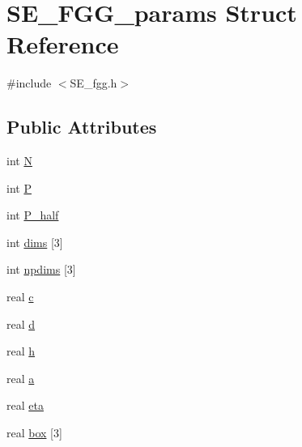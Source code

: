 \hypertarget{structSE__FGG__params}{\section{\-S\-E\-\_\-\-F\-G\-G\-\_\-params \-Struct \-Reference}
\label{structSE__FGG__params}
}


{\ttfamily \#include $<$\-S\-E\-\_\-fgg.\-h$>$}

\subsection*{\-Public \-Attributes}
\begin{DoxyCompactItemize}
\item 
int \hyperlink{structSE__FGG__params_a6fa81b6004b3f45199c8059844619f8e}{\-N}
\item 
int \hyperlink{structSE__FGG__params_af2b82634cd93eb621f9ce9187303d087}{\-P}
\item 
int \hyperlink{structSE__FGG__params_a60d4a6e4fd2d961187c7a91b0b870104}{\-P\-\_\-half}
\item 
int \hyperlink{structSE__FGG__params_a394b6a5377b8f7afc1329728b43723d9}{dims} \mbox{[}3\mbox{]}
\item 
int \hyperlink{structSE__FGG__params_a2cefb286cd7dcf24a31cd331d7a75b92}{npdims} \mbox{[}3\mbox{]}
\item 
real \hyperlink{structSE__FGG__params_a6a4c656e361cd9d9dab1d29aff81fae0}{c}
\item 
real \hyperlink{structSE__FGG__params_ab4b64cbacc8748d353edae97b39db58d}{d}
\item 
real \hyperlink{structSE__FGG__params_ac165a2f559f55e0777e9b19594ac6787}{h}
\item 
real \hyperlink{structSE__FGG__params_a381fb28cfc98af969bc757467aa8135f}{a}
\item 
real \hyperlink{structSE__FGG__params_a186100dc2a5f1be7dccc7d66187c0e15}{eta}
\item 
real \hyperlink{structSE__FGG__params_a412822931449f2a5065b386e34e233c0}{box} \mbox{[}3\mbox{]}
\end{DoxyCompactItemize}


